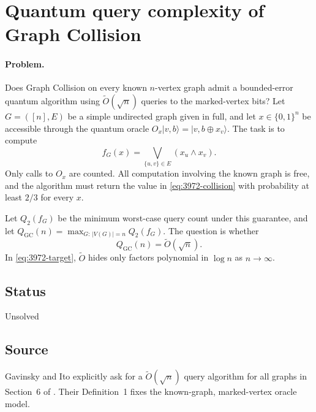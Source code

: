 \section{Quantum query complexity of Graph Collision}
\label{sec:op_39721600d81c6992}

\paragraph{Problem.}
Does Graph Collision on every known $n$-vertex graph admit a bounded-error
quantum algorithm using $\widetilde O(\sqrt n)$ queries to the marked-vertex bits?
Let $G=([n],E)$ be a simple undirected graph given in full, and let
$x\in\{0,1\}^n$ be accessible through the quantum oracle
$O_x|v,b\rangle=|v,b\oplus x_v\rangle$.
The task is to compute
\begin{equation}
  f_G(x)=\bigvee_{\{u,v\}\in E}(x_u\wedge x_v).
  \label{eq:3972-collision}
\end{equation}
Only calls to $O_x$ are counted.
All computation involving the known graph
is free, and the algorithm must return the value in
\eqref{eq:3972-collision} with probability at least $2/3$ for every $x$.

Let $Q_2(f_G)$ be the minimum worst-case query count under this guarantee,
and let $Q_{\mathrm{GC}}(n)=\max_{G:\,|V(G)|=n}Q_2(f_G)$.
The question is whether
\begin{equation}
  Q_{\mathrm{GC}}(n)=\widetilde O(\sqrt n).
  \label{eq:3972-target}
\end{equation}
In \eqref{eq:3972-target}, $\widetilde O$ hides only factors polynomial in
$\log n$ as $n\to\infty$.

\subsection*{Status}

Unsolved

\subsection*{Source}

Gavinsky and Ito explicitly ask for a $\widetilde O(\sqrt n)$ query algorithm
for all graphs in Section~6 of .
Their Definition~1 fixes the known-graph, marked-vertex oracle model.

